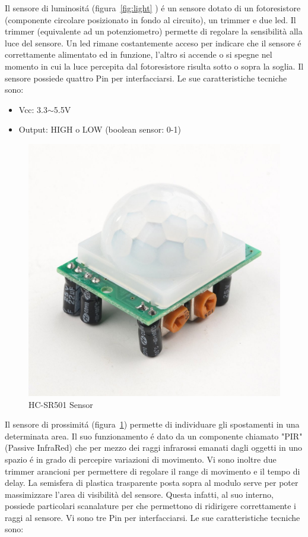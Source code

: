 Il sensore di luminosit\'a (figura~\ref{fig:light} ) \'e un sensore dotato di un fotoresistore (componente circolare posizionato in fondo al circuito), un trimmer e due led. Il trimmer (equivalente ad un potenziometro) permette di regolare la sensibilità alla luce del sensore. Un led rimane costantemente acceso per indicare che il sensore \'e correttamente alimentato ed in funzione, l'altro si accende o si spegne nel momento in cui la luce percepita dal fotoresistore risulta sotto o sopra la soglia. Il sensore possiede quattro Pin per interfacciarsi.
Le sue caratteristiche tecniche sono:

\begin{itemize}
	\item Vcc: 3.3$\sim$5.5V
	\item Output: HIGH o LOW (boolean sensor: 0-1)
\end{itemize}

\newpage

\begin{figure}
	\centering
	\includegraphics[width=0.7\linewidth]{Figures/Sensors&Rasp/pir}
	\caption[PIR] {HC-SR501 Sensor}
	\label{fig:pir}
\end{figure}

Il sensore di prossimit\'a (figura~\ref{fig:pir}) permette di individuare gli spostamenti in una determinata area. Il suo funzionamento \'e dato da un componente chiamato "PIR" (Passive InfraRed) che per mezzo dei raggi infrarossi emanati dagli oggetti in uno spazio \'e in grado di percepire variazioni di movimento. Vi sono inoltre due trimmer arancioni per permettere di regolare il range di movimento e il tempo di delay. La semisfera di plastica trasparente posta sopra al modulo serve per poter massimizzare l'area di visibilità del sensore. Questa infatti, al suo interno, possiede particolari scanalature per che permettono di ridirigere correttamente i raggi al sensore. Vi sono tre Pin per interfacciarsi.
Le sue caratteristiche tecniche sono:

